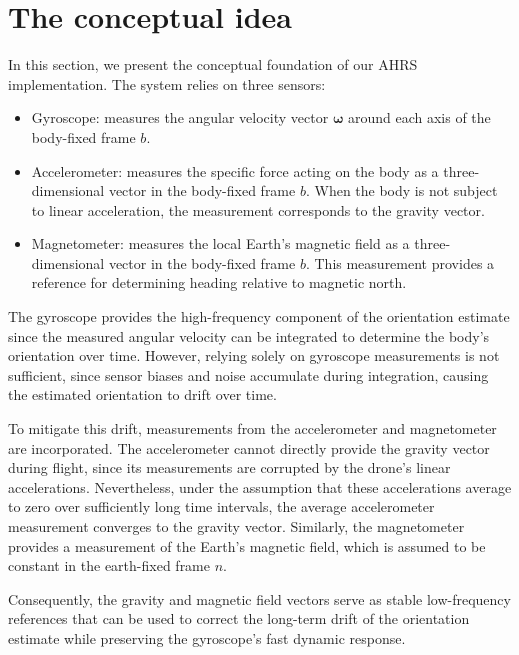 \documentclass{article}
\begin{document}
\section{The conceptual idea}

	In this section, we present the conceptual foundation of our AHRS implementation. The system relies on three sensors:

	\begin{itemize}
		\item Gyroscope: measures the angular velocity vector $\boldsymbol{\omega}$ around each axis of the body-fixed frame $b$.

		\item Accelerometer: measures the specific force acting on the body as a three-dimensional vector in the body-fixed frame $b$. When the body is not subject to linear acceleration, the measurement corresponds to the gravity vector.

		\item Magnetometer: measures the local Earth's magnetic field as a three-dimensional vector in the body-fixed frame $b$. This measurement provides a reference for determining heading relative to magnetic north.


	\end{itemize}

	\noindent The gyroscope provides the high-frequency component of the orientation estimate since the measured angular velocity can be integrated to determine the body's orientation over time. However, relying solely on gyroscope measurements is not sufficient, since sensor biases and noise accumulate during integration, causing the estimated orientation to drift over time.

	\vspace{1em}

	\noindent To mitigate this drift, measurements from the accelerometer and magnetometer are incorporated. The accelerometer cannot directly provide the gravity vector during flight, since its measurements are corrupted by the drone's linear accelerations. Nevertheless, under the assumption that these accelerations average to zero over sufficiently long time intervals, the average accelerometer measurement converges to the gravity vector. Similarly, the magnetometer provides a measurement of the Earth's magnetic field, which is assumed to be constant in the earth-fixed frame $n$.

	\vspace{1em}

	\noindent Consequently, the gravity and magnetic field vectors serve as stable low-frequency references that can be used to correct the long-term drift of the orientation estimate while preserving the gyroscope's fast dynamic response.
\end{document}
